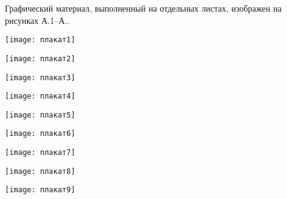 
Графический материал, выполненный на отдельных листах,
изображен на рисунках А.1--А..
\setcounter{числоПлакатов}{0}
\renewcommand{\thefigure}{А.\arabic{figure}} %

\begin{landscape}

\begin{плакат}
    \texttt{[image: плакат1]}
    \label{pl1:image}      
\end{плакат}

\begin{плакат}
    \texttt{[image: плакат2]}
    \label{pl2:image}      
\end{плакат}

\begin{плакат}
    \texttt{[image: плакат3]}
    \label{pl3:image}      
\end{плакат}

\begin{плакат}
    \texttt{[image: плакат4]}
    \label{pl4:image}      
\end{плакат}

\begin{плакат}
    \texttt{[image: плакат5]}
    \label{pl5:image}
\end{плакат}

\begin{плакат}
    \texttt{[image: плакат6]}
    \label{pl6:image}
\end{плакат}

\begin{плакат}
    \texttt{[image: плакат7]}
    \label{pl7:image}
\end{плакат}

\begin{плакат}
    \texttt{[image: плакат8]}
    \label{pl8:image}
\end{плакат}

\begin{плакат}
    \texttt{[image: плакат9]}
    \label{pl9:image}
\end{плакат}

\end{landscape}
